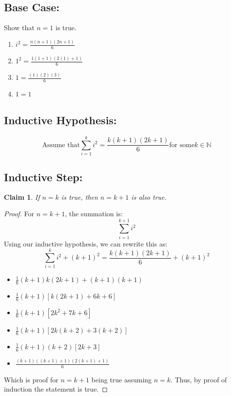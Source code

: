 \documentclass[11pt]{article}
\newtheorem{claim}[theorem]{Claim}
\begin{document}
\subsection*{Base Case:}
Show that $n = 1$ is true.
\begin{enumerate}
\item $i^2 = \frac{n(n+1)(2n+1)}{6}$
\item $1^2 = \frac{1(1+1)(2(1)+1)}{6}$
\item $1 = \frac{(1)(2)(3)}{6}$
\item $1 = 1$
\end{enumerate}

\subsection*{Inductive Hypothesis:}
\begin{equation}
\text{Assume that} \sum^{k}_{i=1}{i^2} = \frac{k(k+1)(2k+1)}{6} \text{for some} k \in \mathbb{N}
\end{equation}
\subsection*{Inductive Step:}
\begin{claim} If $n = k$ is true, then $n = k + 1$ is also true. \end{claim}
\begin{proof}
For $n = k + 1$, the summation is:
\begin{equation}
\sum^{k + 1}_{i = 1}{i^2}
\end{equation}
Using our inductive hypothesis, we can rewrite this as:
\begin{equation}
\sum^{k}_{i = 1}{i^2} + (k + 1)^2 = \frac{k(k+1)(2k+1)}{6} + (k+1)^2
\end{equation}
\begin{itemize}
\item $\frac{1}{6}(k + 1)k(2k + 1) + (k + 1)(k + 1)$
\item $\frac{1}{6}(k + 1)[k(2k + 1) + 6k + 6]$
\item $\frac{1}{6}(k + 1) [2k^2 + 7k + 6]$
\item $\frac{1}{6}(k + 1) [2k(k + 2) + 3(k + 2)]$
\item $\frac{1}{6}(k + 1)(k + 2)[2k + 3]$
\item $\frac{(k + 1)((k + 1) + 1)(2(k + 1) + 1)}{6}$
\end{itemize}

Which is proof for $n = k + 1$ being true assuming $n = k$. Thus, by proof of induction the statement is true.
\end{proof}
\end{document}
